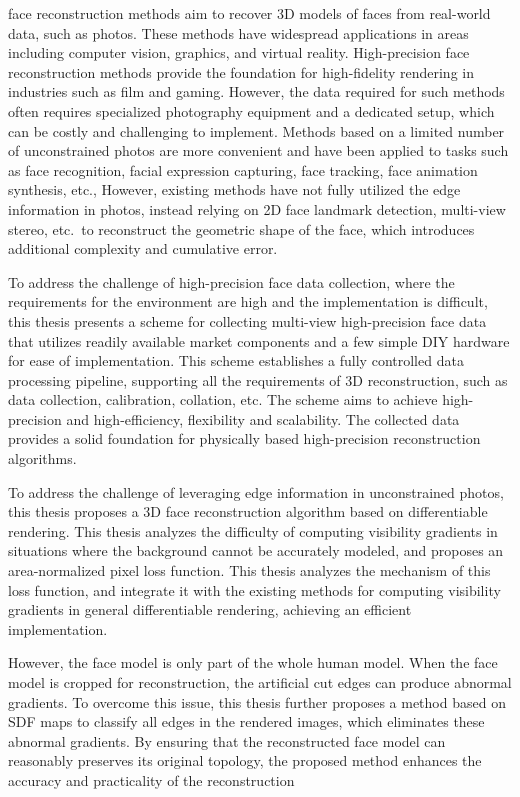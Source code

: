 \documentclass{scutmaster}
\begin{document}
face reconstruction methods aim to recover 3D models of faces from real-world data, such as photos.
These methods have widespread applications in areas including computer vision, graphics, and virtual reality.
High-precision face reconstruction methods provide the foundation for high-fidelity rendering in industries such as film and gaming.
However, the data required for such methods often requires specialized photography equipment and a dedicated setup,
which can be costly and challenging to implement.
Methods based on a limited number of unconstrained photos are more convenient and
have been applied to tasks such as face recognition, facial expression capturing, face tracking, face animation synthesis, etc.,
However, existing methods have not fully utilized the edge information in photos,
instead relying on 2D face landmark detection, multi-view stereo, etc.\ to reconstruct the geometric shape of the face,
which introduces additional complexity and cumulative error.

To address the challenge of high-precision face data collection,
where the requirements for the environment are high and the implementation is difficult,
this thesis presents a scheme for collecting multi-view high-precision face data
that utilizes readily available market components and a few simple DIY hardware for ease of implementation.
This scheme establishes a fully controlled data processing pipeline,
supporting all the requirements of 3D reconstruction, such as data collection, calibration, collation, etc.
The scheme aims to achieve high-precision and high-efficiency, flexibility and scalability.
The collected data provides a solid foundation for physically based high-precision reconstruction algorithms.

To address the challenge of leveraging edge information in unconstrained photos,
this thesis proposes a 3D face reconstruction algorithm based on differentiable rendering.
This thesis analyzes the difficulty  of computing visibility gradients in situations where the background cannot be accurately modeled,
and proposes an area-normalized pixel loss function.
This thesis analyzes the mechanism of this loss function,
and integrate it with the existing methods for computing visibility gradients in general differentiable rendering,
achieving an efficient implementation.

However, the face model is only part of the whole human model.
When the face model is cropped for reconstruction,
the artificial cut edges can produce abnormal gradients.
To overcome this issue, this thesis further proposes a method based on SDF maps to classify all edges in the rendered images,
which eliminates these abnormal gradients.
By ensuring that the reconstructed face model can reasonably preserves its original topology,
the proposed method enhances the accuracy and practicality of the reconstruction
\end{document}
